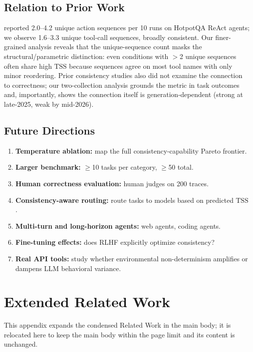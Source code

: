 \documentclass[11pt]{article}
\newcommand{\tss}{\mathrm{TSS}}
\begin{document}
\subsection*{Relation to Prior Work}

\citet{mehta2026disagree} reported 2.0--4.2 unique action sequences per 10 runs
on HotpotQA ReAct agents; we observe 1.6--3.3 unique tool-call sequences, broadly
consistent. Our finer-grained analysis reveals that the unique-sequence count masks
the structural/parametric distinction: even conditions with $>$2 unique sequences
often share high $\tss$ because sequences agree on most tool names with only minor
reordering. Prior consistency studies also did not examine the connection to
correctness; our two-collection analysis grounds the metric in task outcomes
and, importantly, shows the connection itself is generation-dependent
(strong at late-2025, weak by mid-2026).

\subsection*{Future Directions}

\begin{enumerate}[leftmargin=1.5em]
  \item \textbf{Temperature ablation:} map the full consistency-capability
    Pareto frontier.
  \item \textbf{Larger benchmark:} $\geq$10 tasks per category, $\geq$50 total.
  \item \textbf{Human correctness evaluation:} human judges on 200 traces.
  \item \textbf{Consistency-aware routing:} route tasks to models based on
    predicted $\tss$.
  \item \textbf{Multi-turn and long-horizon agents:} web agents, coding agents.
  \item \textbf{Fine-tuning effects:} does RLHF explicitly optimize
    consistency?
  \item \textbf{Real API tools:} study whether environmental non-determinism
    amplifies or dampens LLM behavioral variance.
\end{enumerate}

\section{Extended Related Work}
\label{app:relwork}

This appendix expands the condensed Related Work in the main body; it is
relocated here to keep the main body within the page limit and its content is
unchanged.
\end{document}
